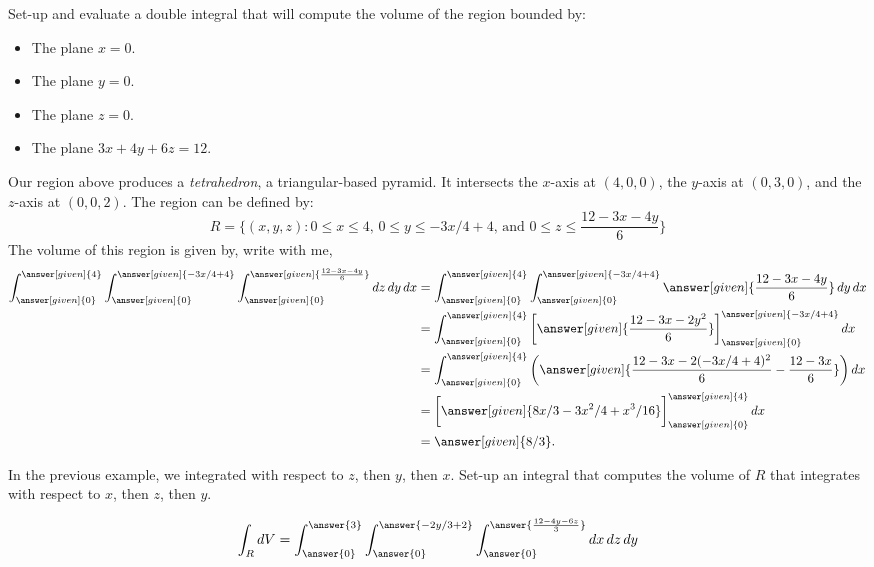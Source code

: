 \documentclass{ximera}
\begin{document}
\begin{example}
  Set-up and evaluate a double integral that will compute the volume of
  the region bounded by:
  \begin{itemize}
  \item The plane $x=0$.
  \item The plane $y=0$.
  \item The plane $z=0$.
  \item The plane $3x + 4y + 6z = 12$.
  \end{itemize}
  \begin{explanation}
    Our region above produces a
    \textit{tetrahedron}, a triangular-based
    pyramid. It intersects the $x$-axis at $(4,0,0)$, the $y$-axis at
    $(0,3,0)$, and the $z$-axis at $(0,0,2)$.  The region can be
    defined by:
    \[
    R=\{(x,y,z):\text{$0\leq x\leq 4$, $0\leq y\leq -3x/4+4$, and $0\leq z \leq \frac{12-3x-4y}{6}$}\}
    \]
    The volume of this region is given by, write with me, 
    \begin{align*}
      \int_{\answer[given]{0}}^{\answer[given]{4}} \int_{\answer[given]{0}}^{\answer[given]{-3x/4+4}} \int_{\answer[given]{0}}^{\answer[given]{\frac{12-3x-4y}{6}}}\d z \d y\d x &=\int_{\answer[given]{0}}^{\answer[given]{4}} \int_{\answer[given]{0}}^{\answer[given]{-3x/4+4}} \answer[given]{\frac{12-3x-4y}{6}} \d y \d x\\
      &= \int_{\answer[given]{0}}^{\answer[given]{4}}  \eval{\answer[given]{\frac{12-3x-2y^2}{6}}}_{\answer[given]{0}}^{\answer[given]{-3x/4+4}} \d x\\
      &= \int_{\answer[given]{0}}^{\answer[given]{4}}  \left(\answer[given]{\frac{12-3x-2(-3x/4+4)^2}{6} - \frac{12-3x}{6}}\right) \d x\\
      &= \eval{\answer[given]{8x/3-3x^2/4+x^3/16}}_{\answer[given]{0}}^{\answer[given]{4}} \d x\\
      &=\answer[given]{8/3}.
    \end{align*}    
  \end{explanation}
\end{example}

\begin{question}
  In the previous example, we integrated with respect to $z$, then
  $y$, then $x$. Set-up an integral that computes the volume of $R$
  that integrates with respect to $x$, then $z$, then $y$.
  \begin{prompt}
    \[
    \int_R \d V = \int_{\answer{0}}^{\answer{3}}\int_{\answer{0}}^{\answer{-2y/3+2}} \int_{\answer{0}}^{\answer{\frac{12-4y-6z}{3}}} \d x \d z \d y
    \]
  \end{prompt}
\end{question}
\end{document}
